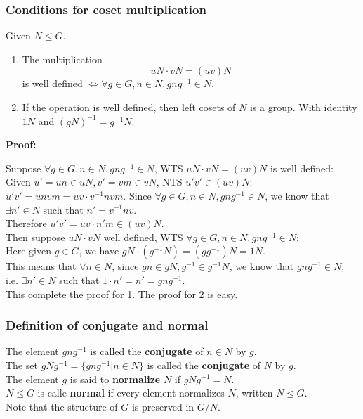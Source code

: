 \documentclass{article}
\begin{document}
\subsubsection*{Conditions for coset multiplication}
Given $N \leq G$.
\begin{enumerate}
    \item The multiplication
    \begin{equation*}
        uN \cdot vN = (uv)N
    \end{equation*}
    is well defined $\iff \forall g \in G, n \in N, gng^{-1} \in N$.
    \item If the operation is well defined, then left cosets of $N$ is a group. With identity $1N$ and $(gN)^{-1} = g^{-1}N$.
\end{enumerate}
\textbf{Proof:}
\begin{addmargin}[1em]{0em}
    Suppose $\forall g \in G, n \in N, gng^{-1} \in N$, WTS $uN\cdot vN = (uv)N$ is well defined:\\
    Given $u' = un \in uN, v' = vm \in vN$, NTS $u'v' \in (uv)N$:\\
    $u'v' = unvm = uv\cdot v^{-1}nvm$. Since $\forall g \in G, n \in N, gng^{-1} \in N$, we know that $\exists n' \in N$ such that $n' = v^{-1}nv$.\\
    Therefore $u'v' = uv\cdot n'm \in (uv)N$.\\
    Then suppose $uN \cdot vN$ well defined, WTS $\forall g \in G, n \in N, gng^{-1} \in N$:\\
    Here given $g \in G$, we have $gN \cdot (g^{-1}N) = (gg^{-1})N = 1N$.\\
    This means that $\forall n \in N$, since $gn \in gN, g^{-1} \in g^{-1}N$, we know that $gng^{-1} \in N$, i.e. $\exists n' \in N$ such that $1\cdot n' = n' = gng^{-1}$.\\
    This complete the proof for 1. The proof for 2 is easy.
\end{addmargin}
\subsubsection*{Definition of conjugate and normal}
The element $gng^{-1}$ is called the \textbf{conjugate} of $n \in N$ by $g$.\\
The set $gNg^{-1} = \{gng^{-1} | n \in N\}$ is called the \textbf{conjugate} of $N$ by $g$.\\
The element $g$ is said to \textbf{normalize} $N$ if $gNg^{-1} = N$.\\
$N \leq G$ is calle \textbf{normal} if every element normalizes $N$, written $N \trianglelefteq G$.\\
Note that the structure of $G$ is preserved in $G/N$.
\end{document}
